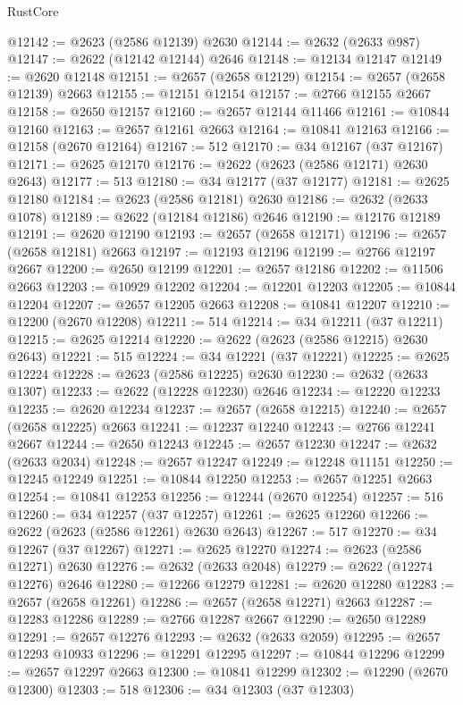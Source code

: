 \begin{lexlean}{RustCore}
\begin{coremodule}
@12142 := @2623 (@2586 @12139) @2630
@12144 := @2632 (@2633 @987)
@12147 := @2622 (@12142 @12144) @2646
@12148 := @12134 @12147
@12149 := @2620 @12148
@12151 := @2657 (@2658 @12129)
@12154 := @2657 (@2658 @12139) @2663
@12155 := @12151 @12154
@12157 := @2766 @12155 @2667
@12158 := @2650 @12157
@12160 := @2657 @12144 @11466
@12161 := @10844 @12160
@12163 := @2657 @12161 @2663
@12164 := @10841 @12163
@12166 := @12158 (@2670 @12164)
@12167 := 512
@12170 := @34 @12167 (@37 @12167)
@12171 := @2625 @12170
@12176 := @2622 (@2623 (@2586 @12171) @2630 @2643)
@12177 := 513
@12180 := @34 @12177 (@37 @12177)
@12181 := @2625 @12180
@12184 := @2623 (@2586 @12181) @2630
@12186 := @2632 (@2633 @1078)
@12189 := @2622 (@12184 @12186) @2646
@12190 := @12176 @12189
@12191 := @2620 @12190
@12193 := @2657 (@2658 @12171)
@12196 := @2657 (@2658 @12181) @2663
@12197 := @12193 @12196
@12199 := @2766 @12197 @2667
@12200 := @2650 @12199
@12201 := @2657 @12186
@12202 := @11506 @2663
@12203 := @10929 @12202
@12204 := @12201 @12203
@12205 := @10844 @12204
@12207 := @2657 @12205 @2663
@12208 := @10841 @12207
@12210 := @12200 (@2670 @12208)
@12211 := 514
@12214 := @34 @12211 (@37 @12211)
@12215 := @2625 @12214
@12220 := @2622 (@2623 (@2586 @12215) @2630 @2643)
@12221 := 515
@12224 := @34 @12221 (@37 @12221)
@12225 := @2625 @12224
@12228 := @2623 (@2586 @12225) @2630
@12230 := @2632 (@2633 @1307)
@12233 := @2622 (@12228 @12230) @2646
@12234 := @12220 @12233
@12235 := @2620 @12234
@12237 := @2657 (@2658 @12215)
@12240 := @2657 (@2658 @12225) @2663
@12241 := @12237 @12240
@12243 := @2766 @12241 @2667
@12244 := @2650 @12243
@12245 := @2657 @12230
@12247 := @2632 (@2633 @2034)
@12248 := @2657 @12247
@12249 := @12248 @11151
@12250 := @12245 @12249
@12251 := @10844 @12250
@12253 := @2657 @12251 @2663
@12254 := @10841 @12253
@12256 := @12244 (@2670 @12254)
@12257 := 516
@12260 := @34 @12257 (@37 @12257)
@12261 := @2625 @12260
@12266 := @2622 (@2623 (@2586 @12261) @2630 @2643)
@12267 := 517
@12270 := @34 @12267 (@37 @12267)
@12271 := @2625 @12270
@12274 := @2623 (@2586 @12271) @2630
@12276 := @2632 (@2633 @2048)
@12279 := @2622 (@12274 @12276) @2646
@12280 := @12266 @12279
@12281 := @2620 @12280
@12283 := @2657 (@2658 @12261)
@12286 := @2657 (@2658 @12271) @2663
@12287 := @12283 @12286
@12289 := @2766 @12287 @2667
@12290 := @2650 @12289
@12291 := @2657 @12276
@12293 := @2632 (@2633 @2059)
@12295 := @2657 @12293 @10933
@12296 := @12291 @12295
@12297 := @10844 @12296
@12299 := @2657 @12297 @2663
@12300 := @10841 @12299
@12302 := @12290 (@2670 @12300)
@12303 := 518
@12306 := @34 @12303 (@37 @12303)

\end{coremodule}
\end{lexlean}
